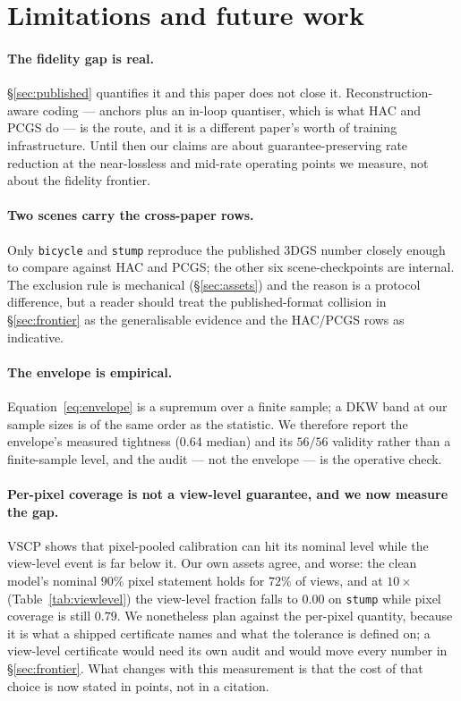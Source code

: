 \documentclass[preprint,number,3p]{elsarticle}
\begin{document}
\section{Limitations and future work}
\label{sec:limits}

\paragraph{The fidelity gap is real.} \S\ref{sec:published} quantifies it and this paper does not close it.
Reconstruction-aware coding --- anchors plus an in-loop quantiser, which is what HAC and PCGS do --- is the route, and
it is a different paper's worth of training infrastructure. Until then our claims are about guarantee-preserving rate
reduction at the near-lossless and mid-rate operating points we measure, not about the fidelity frontier.

\paragraph{Two scenes carry the cross-paper rows.} Only \texttt{bicycle} and \texttt{stump} reproduce the published
3DGS number closely enough to compare against HAC and PCGS; the other six scene-checkpoints are internal. The
exclusion rule is mechanical (\S\ref{sec:assets}) and the reason is a protocol difference, but a reader should treat
the published-format collision in \S\ref{sec:frontier} as the generalisable evidence and the HAC/PCGS rows as
indicative.

\paragraph{The envelope is empirical.} Equation~\eqref{eq:envelope} is a supremum over a finite sample; a DKW band at
our sample sizes is of the same order as the statistic. We therefore report the envelope's measured tightness
($0.64$ median) and its $56/56$ validity rather than a finite-sample level, and the audit --- not the envelope --- is
the operative check.

\paragraph{Per-pixel coverage is not a view-level guarantee, and we now measure the gap.} VSCP \cite{vscp} shows
that pixel-pooled calibration can hit its nominal level while the view-level event is far below it. Our own assets
agree, and worse: the clean model's nominal $90\%$ pixel statement holds for $72\%$ of views, and at $10\times$
(Table~\ref{tab:viewlevel}) the view-level fraction falls to $0.00$ on \texttt{stump} while pixel coverage is still
$0.79$. We nonetheless plan against the per-pixel quantity, because it is what a shipped certificate names and what
the tolerance is defined on; a view-level certificate would need its own audit and would move every number in
\S\ref{sec:frontier}. What changes with this measurement is that the cost of that choice is now stated in points, not
in a citation.
\end{document}
